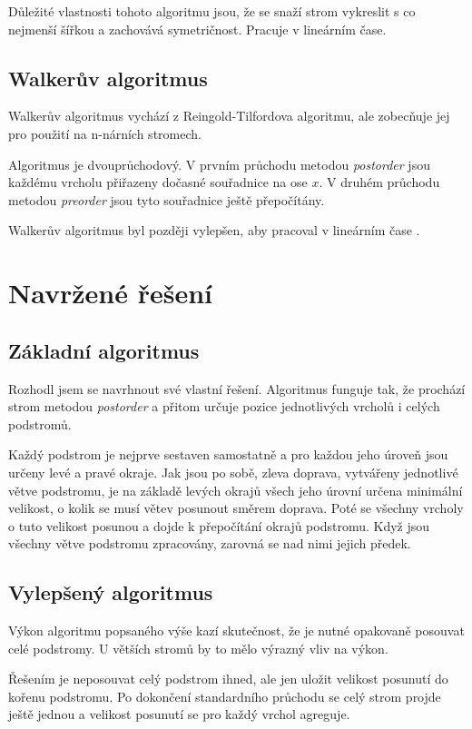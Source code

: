 \documentclass[12pt, a4paper]{report}
\begin{document}
Důležité vlastnosti tohoto algoritmu jsou, že se snaží strom vykreslit s co nejmenší šířkou a zachovává symetričnost. Pracuje v lineárním čase.

\section{Walkerův algoritmus}
Walkerův algoritmus \cite{walker} vychází z Reingold-Tilfordova algoritmu, ale zobecňuje jej pro použití na n-nárních stromech.

Algoritmus je dvouprůchodový. V prvním průchodu metodou \emph{postorder} jsou každému vrcholu přiřazeny dočasné souřadnice na ose $x$. V druhém průchodu metodou \emph{preorder} jsou tyto souřadnice ještě přepočítány.

Walkerův algoritmus byl později vylepšen, aby pracoval v lineárním čase \cite{buchheim}.

\chapter{Navržené řešení}
\label{sec:solution}

\section{Základní algoritmus}
Rozhodl jsem se navrhnout své vlastní řešení. Algoritmus funguje tak, že prochází strom metodou \emph{postorder} a přitom určuje pozice jednotlivých vrcholů i celých podstromů.

Každý podstrom je nejprve sestaven samostatně a pro každou jeho úroveň jsou určeny levé a pravé okraje. Jak jsou po sobě, zleva doprava, vytvářeny jednotlivé větve podstromu, je na základě levých okrajů všech jeho úrovní určena minimální velikost, o kolik se musí větev posunout směrem doprava. Poté se všechny vrcholy o tuto velikost posunou a dojde k přepočítání okrajů podstromu. Když jsou všechny větve podstromu zpracovány, zarovná se nad nimi jejich předek.

\section{Vylepšený algoritmus}
Výkon algoritmu popsaného výše kazí skutečnost, že je nutné opakovaně posouvat celé podstromy. U větších stromů by to mělo výrazný vliv na výkon.

Řešením je neposouvat celý podstrom ihned, ale jen uložit velikost posunutí do kořenu podstromu. Po dokončení standardního průchodu se celý strom projde ještě jednou a velikost posunutí se pro každý vrchol agreguje. 
\end{document}

